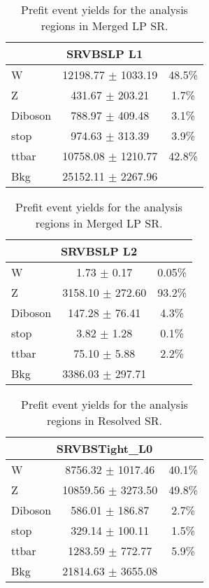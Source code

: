 \begin{table}
\begin{center}
\caption{Prefit event yields for the analysis regions in \olep Merged LP SR.}
\label{tab:PrefitYield_1lepLPSR_Per}
\begin{tabular}{|l|c| c|}
\hline
\multicolumn{3}{|c|}{SRVBSLP L1}\\ \hline
W & 12198.77 $\pm$ 1033.19 & 48.5\% \\
Z & 431.67 $\pm$ 203.21 & 1.7\% \\
Diboson & 788.97 $\pm$ 409.48 & 3.1\% \\
stop & 974.63 $\pm$ 313.39 & 3.9\% \\
ttbar & 10758.08 $\pm$ 1210.77 & 42.8\% \\
\hline
Bkg & 25152.11 $\pm$ 2267.96 & \\ \hline
\end{tabular}
\end{center}
\end{table}

\begin{table}
\caption{Prefit event yields for the analysis regions in \tlep Merged LP SR.}
\begin{center}
\label{tab:PrefitYield_2lepLPSR_Per}
\begin{tabular}{|l|c|c|}
\hline
\multicolumn{3}{|c|}{SRVBSLP L2}\\ \hline
W & 1.73 $\pm$ 0.17 & 0.05\% \\
Z & 3158.10 $\pm$ 272.60 & 93.2\% \\
Diboson & 147.28 $\pm$ 76.41 & 4.3\% \\
stop & 3.82 $\pm$ 1.28 & 0.1\%\\
ttbar & 75.10 $\pm$ 5.88 & 2.2\% \\
\hline
Bkg & 3386.03 $\pm$ 297.71 & \\ \hline
\end{tabular}
\end{center}
\end{table}

\begin{table}[h]
\caption{Prefit event yields for the analysis regions in \zlep Resolved SR.}
\label{tab:PrefitYield_0lepResSR_Per}
\begin{center}
\begin{tabular}{|l|c|c|}
\hline
\multicolumn{3}{|c|}{SRVBSTight\_L0}\\ \hline
W & 8756.32 $\pm$ 1017.46 & 40.1\% \\
Z & 10859.56 $\pm$ 3273.50 & 49.8\% \\
Diboson & 586.01 $\pm$ 186.87 & 2.7\% \\
stop & 329.14 $\pm$ 100.11 & 1.5\% \\
ttbar & 1283.59 $\pm$ 772.77 & 5.9\%\\
\hline
Bkg & 21814.63 $\pm$ 3655.08 & \\
 \hline
\end{tabular}
\end{center}
\end{table}


